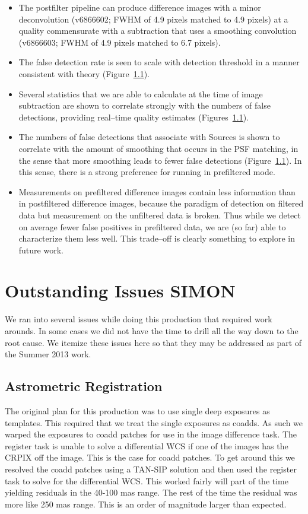 \documentclass[prd, nofootinbib, floatfix, 11pt,tightenlines,times]{article}
\begin{document}
\begin{itemize}
\item The postfilter pipeline can produce difference images with a
  minor deconvolution (v6866602; FWHM of 4.9 pixels matched to 4.9
  pixels) at a quality commensurate with a subtraction that uses a
  smoothing convolution (v6866603; FWHM of 4.9 pixels matched to 6.7
  pixels).

\item The false detection rate is seen to scale with detection
  threshold in a manner consistent with theory (Figure~\ref{}).

\item Several statistics that we are able to calculate at the time of
  image subtraction are shown to correlate strongly with the numbers
  of false detections, providing real--time quality estimates
  (Figures~\ref{}).

\item The numbers of false detections that associate with Sources is
  shown to correlate with the amount of smoothing that occurs in the
  PSF matching, in the sense that more smoothing leads to fewer false
  detections (Figure~\ref{}).  In this sense, there is a strong
  preference for running in prefiltered mode.

\item Measurements on prefiltered difference images contain less
  information than in postfiltered difference images, because the
  paradigm of detection on filtered data but measurement on the
  unfiltered data is broken.  Thus while we detect on average fewer
  false positives in prefiltered data, we are (so far) able to
  characterize them less well.  This trade--off is clearly something
  to explore in future work.

\end{itemize}

\section{Outstanding Issues {\bf SIMON}}
We ran into several issues while doing this production that required work 
arounds.  In some cases we did not have the time to drill all the way down
to the root cause.  We itemize these issues here so that they may be addressed 
as part of the Summer 2013 work.


\subsection{Astrometric Registration \label{subsec-astrom}}
The original plan for this production was to use single deep exposures as 
templates.  This required that we treat the single exposures as coadds.  As 
such we warped the exposures to coadd patches for use in the image difference
task.  The register task is unable to solve a differential WCS if one of the images
has the CRPIX off the image.  This is the case for coadd patches.  To get around this
we resolved the coadd patches using a TAN-SIP solution and then used the register
task to solve for the differential WCS.  This worked fairly will part of the time 
yielding residuals in the 40-100 mas range.  The rest of the time the 
residual was more like 250 mas range.  This is an order of magnitude larger than expected.
\end{document}
